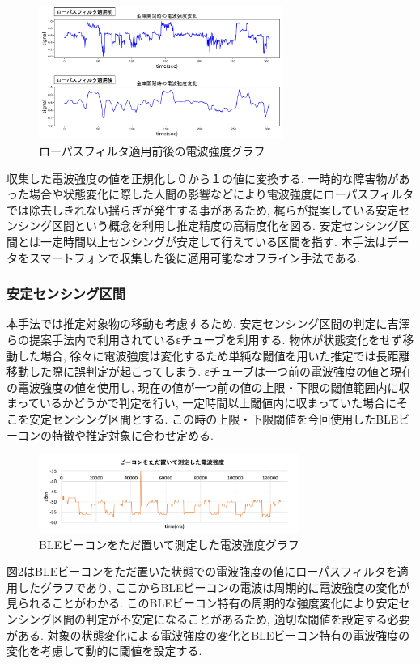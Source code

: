 \documentclass[Japanese]{dicomopapers}
\begin{document}
\begin{figure}[t]
 \centering
 \includegraphics[width=8cm]{lowpath_compare.png}
 \caption{ローパスフィルタ適用前後の電波強度グラフ}
 \label{bank-opcl}
\end{figure}

収集した電波強度の値を正規化し０から１の値に変換する.
一時的な障害物があった場合や状態変化に際した人間の影響などにより電波強度にローパスフィルタでは除去しきれない揺らぎが発生する事があるため, 梶ら\cite{sensing-area}が提案している安定センシング区間という概念を利用し推定精度の高精度化を図る.
安定センシング区間とは一定時間以上センシングが安定して行えている区間を指す.
本手法はデータをスマートフォンで収集した後に適用可能なオフライン手法である.


\subsubsection{安定センシング区間}
本手法では推定対象物の移動も考慮するため, 安定センシング区間の判定に吉澤らの提案手法\cite{ips-chube}内で利用されているεチューブを利用する.
物体が状態変化をせず移動した場合, 徐々に電波強度は変化するため単純な閾値を用いた推定では長距離移動した際に誤判定が起こってしまう.
εチューブは一つ前の電波強度の値と現在の電波強度の値を使用し, 現在の値が一つ前の値の上限・下限の閾値範囲内に収まっているかどうかで判定を行い, 一定時間以上閾値内に収まっていた場合にそこを安定センシング区間とする.
この時の上限・下限閾値を今回使用したBLEビーコンの特徴や推定対象に合わせ定める.
\begin{figure}[ht]
    \centering
    \includegraphics[width=8.5cm]{bokoboko.png}
    \caption{BLEビーコンをただ置いて測定した電波強度グラフ}
    \label{nomal-data}
\end{figure}

図\ref{nomal-data}はBLEビーコンをただ置いた状態での電波強度の値にローパスフィルタを適用したグラフであり, ここからBLEビーコンの電波は周期的に電波強度の変化が見られることがわかる.
このBLEビーコン特有の周期的な強度変化により安定センシング区間の判定が不安定になることがあるため, 適切な閾値を設定する必要がある.
対象の状態変化による電波強度の変化とBLEビーコン特有の電波強度の変化を考慮して動的に閾値を設定する.
\end{document}
